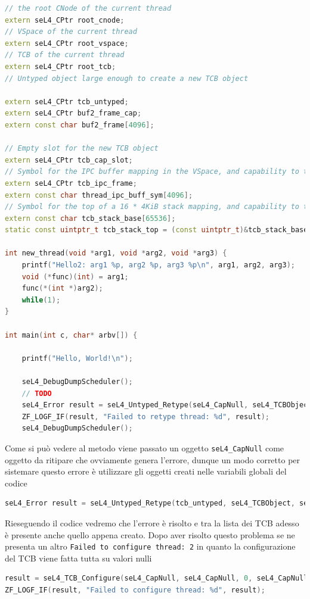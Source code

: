 \begin{lstlisting}[language=C++]
// the root CNode of the current thread
extern seL4_CPtr root_cnode;
// VSpace of the current thread
extern seL4_CPtr root_vspace;
// TCB of the current thread
extern seL4_CPtr root_tcb;
// Untyped object large enough to create a new TCB object

extern seL4_CPtr tcb_untyped;
extern seL4_CPtr buf2_frame_cap;
extern const char buf2_frame[4096];

// Empty slot for the new TCB object
extern seL4_CPtr tcb_cap_slot;
// Symbol for the IPC buffer mapping in the VSpace, and capability to the mapping
extern seL4_CPtr tcb_ipc_frame;
extern const char thread_ipc_buff_sym[4096];
// Symbol for the top of a 16 * 4KiB stack mapping, and capability to the mapping
extern const char tcb_stack_base[65536];
static const uintptr_t tcb_stack_top = (const uintptr_t)&tcb_stack_base + sizeof(tcb_stack_base);

int new_thread(void *arg1, void *arg2, void *arg3) {
    printf("Hello2: arg1 %p, arg2 %p, arg3 %p\n", arg1, arg2, arg3);
    void (*func)(int) = arg1;
    func(*(int *)arg2);
    while(1);
}

int main(int c, char* arbv[]) {

    printf("Hello, World!\n");

    seL4_DebugDumpScheduler();
	// TODO
    seL4_Error result = seL4_Untyped_Retype(seL4_CapNull, seL4_TCBObject, seL4_TCBBits, seL4_CapNull, 0, 0, seL4_CapNull, 1);
    ZF_LOGF_IF(result, "Failed to retype thread: %d", result);
    seL4_DebugDumpScheduler();
\end{lstlisting}
Come si può vedere al metodo viene passato un oggetto \texttt{seL4\_CapNull} come oggetto da ritipare che ovviamente genera l'errore, dunque un modo corretto per sistemare questo errore è utilizzare gli oggetti creati nelle variabili globali del codice
\begin{lstlisting}[language=C++]
seL4_Error result = seL4_Untyped_Retype(tcb_untyped, seL4_TCBObject, seL4_TCBBits, root_cnode, 0, 0, tcb_cap_slot, 1);
\end{lstlisting}
Rieseguendo il codice vedremo che l'errore è risolto e tra la lista dei TCB adesso è presente anche quello appena creato. Dopo aver risolto questo problema se ne presenta un altro \texttt{Failed to configure thread: 2} in quanto la configurazione del TCB viene fatta tutta su valori nulli
\begin{lstlisting}[language=C++]
result = seL4_TCB_Configure(seL4_CapNull, seL4_CapNull, 0, seL4_CapNull, 0, 0, (seL4_Word) NULL, seL4_CapNull);
ZF_LOGF_IF(result, "Failed to configure thread: %d", result);
\end{lstlisting}
